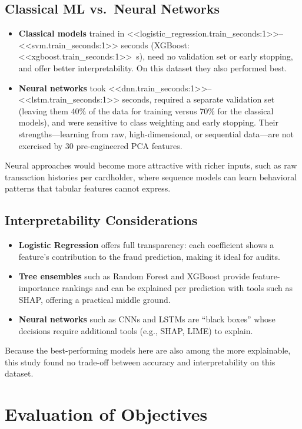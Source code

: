 \documentclass[journal]{IEEEtran}
\begin{document}
\subsection{Classical ML vs.\ Neural Networks}
\begin{itemize}
  \item \textbf{Classical models} trained in <<logistic_regression.train_seconds:1>>--<<svm.train_seconds:1>> seconds (XGBoost: <<xgboost.train_seconds:1>>~s), need no validation set or early stopping, and offer better interpretability. On this dataset they also performed best.
  \item \textbf{Neural networks} took <<dnn.train_seconds:1>>--<<lstm.train_seconds:1>> seconds, required a separate validation set (leaving them 40\% of the data for training versus 70\% for the classical models), and were sensitive to class weighting and early stopping. Their strengths---learning from raw, high-dimensional, or sequential data---are not exercised by 30 pre-engineered PCA features.
\end{itemize}
Neural approaches would become more attractive with richer inputs, such as raw transaction histories per cardholder, where sequence models can learn behavioral patterns that tabular features cannot express.

\subsection{Interpretability Considerations}
\begin{itemize}
  \item \textbf{Logistic Regression} offers full transparency: each coefficient shows a feature's contribution to the fraud prediction, making it ideal for audits.
  \item \textbf{Tree ensembles} such as Random Forest and XGBoost provide feature-importance rankings and can be explained per prediction with tools such as SHAP, offering a practical middle ground.
  \item \textbf{Neural networks} such as CNNs and LSTMs are ``black boxes'' whose decisions require additional tools (e.g., SHAP, LIME) to explain.
\end{itemize}
Because the best-performing models here are also among the more explainable, this study found no trade-off between accuracy and interpretability on this dataset.

\section{Evaluation of Objectives}
\end{document}
